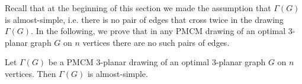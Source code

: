 Recall that at the beginning of this section we made the assumption that $\Gamma(G)$ is almost-simple, i.e. there is no pair of edges that cross twice in the drawing $\Gamma(G)$. In the following, we prove that in any PMCM drawing of an optimal $3$-planar graph $G$ on $n$ vertices there are no such pairs of edges.

\begin{lemma}
Let $\Gamma(G)$ be a PMCM $3$-planar drawing of an optimal $3$-planar graph $G$ on $n$ vertices. Then $\Gamma(G)$ is almost-simple.
\label{lem:3_planar_cross_twice}
\end{lemma}

